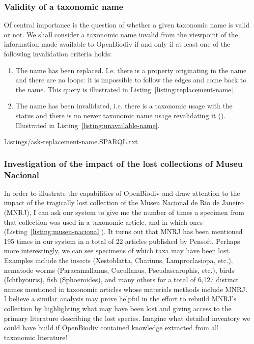 \subsubsection{Validity of a taxonomic name}

Of central importance is the question of whether a given taxonomic name is valid or not. We shall consider a taxonomic name invalid from the viewpoint of the information made available to OpenBiodiv if and only if at least one of the following invalidation criteria holds:

\begin{enumerate}
\item{The name has been replaced. I.e. there is a  property originating in the name and there are no loops: it is impossible to follow the  edges and come back to the name. This query is illustrated in Listing~\ref{listing:replacement-name}}.
\item{The name has been invalidated, i.e. there is a taxonomic usage with the status  and there is no newer taxonomic name usage revalidating it (). Illustrated in Listing~\ref{listing:unavailable-name}.}
\end{enumerate}


{Listings/ask-replacement-name.SPARQL.txt}



\subsubsection{Investigation of the impact of the lost collections of Museu Nacional}

In order to illustrate the capabilities of OpenBiodiv and draw attention to the impact of the tragically lost collection of the Museu Nacional de Rio de Janeiro (MNRJ), I can ask our system to give me the number of times a specimen from that collection was used in a taxonomic article, and in which ones (Listing~\ref{listing:museu-nacional}). It turns out that MNRJ has been mentioned 195 times in our system in a total of 22 articles published by Pensoft. Perhaps more interestingly, we can see specimens of which taxa may have been lost. Examples include the insects (Xestoblatta, Charinus, Lamproclasiopa, etc.), nematode worms (Paracamallanus, Cucullanus, Pseudascarophis, etc.), birds (Ichthyouris), fish (Sphoeroides), and many others for a total of 6,127 distinct names mentioned in taxonomic articles whose materials methods include MNRJ. I believe a similar analysis may prove helpful in the effort to rebuild MNRJ’s collection by highlighting what may have been lost and giving access to the primary literature describing the lost species. Imagine what detailed inventory we could have build if OpenBiodiv contained knowledge extracted from all taxonomic literature!


